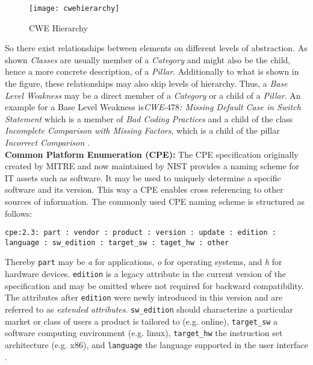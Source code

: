 \begin{figure}[H]
	\centering
	\texttt{[image: cwehierarchy]}
	\caption[CWE Hierarchy]{CWE Hierarchy }
	\label{fig:CWE Hierarchy}
\end{figure}

So there exist relationships between elements on different levels of abstraction. As shown \textit{Classes} are usually member of a \textit{Category} and might also be the child, hence a more concrete description, of a \textit{Pillar}. Additionally to what is shown in the figure, these relationships may also skip levels of hierarchy. Thus, a \textit{Base Level Weakness} may be a direct member of a \textit{Category} or a child of a \textit{Pillar}. An example for a Base Level Weakness is\textit{CWE}-478\textit{: Missing Default Case in Switch Statement} which is a member of \textit{Bad Coding Practices} and a child of the class \textit{Incomplete Comparison with Missing Factors}, which is a child of the pillar \textit{Incorrect Comparison} \cite{CWEWebsite}.\\

\noindent
\textbf{Common Platform Enumeration (CPE):} The CPE specification originally created by MITRE and now maintained by NIST provides a naming scheme for IT assets such as software. It may be used to uniquely determine a specific software and its version. This way a CPE enables cross referencing to other sources of information. The commonly used CPE naming scheme is structured as follows:\\
\noindent
\begin{lstlisting}[caption=CPE Formatted String Binding, captionpos=b, label=lst:CPE]
cpe:2.3: part : vendor : product : version : update : edition : language : sw_edition : target_sw : taget_hw : other
\end{lstlisting}

Thereby \lstinline|part| may be \textit{a} for applications, \textit{o} for operating systems, and \textit{h} for hardware devices. \lstinline|edition| is a legacy attribute in the current version of the specification and may be omitted where not required for backward compatibility. The attributes after \lstinline|edition| were newly introduced in this version and are referred to as \textit{extended attributes}. \lstinline|sw_edition| should characterize a particular market or class of users a product is tailored to (e.g. online), \lstinline|target_sw| a software computing environment (e.g. linux), \lstinline|target_hw| the instruction set architecture (e.g. x86), and \lstinline|language| the language supported in the user interface \cite{CPESpec}.\\

